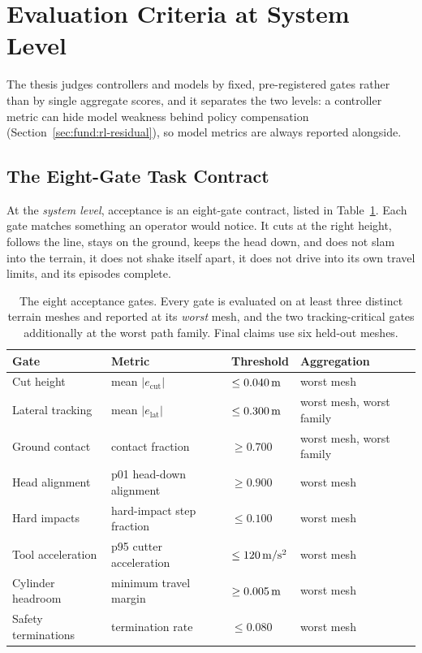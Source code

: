 \section{Evaluation Criteria at System Level}
\label{sec:sys:evaluation-criteria}

The thesis judges controllers and models by fixed, pre-registered
gates rather than by single aggregate scores, and it separates the two levels: a controller metric can hide model weakness behind
policy compensation (Section~\ref{sec:fund:rl-residual}), so model
metrics are always reported alongside.

\subsection{The Eight-Gate Task Contract}

At the \emph{system level}, acceptance is an eight-gate contract, listed
in Table~\ref{tab:sys:gates}. Each gate matches something an operator would notice. It cuts at the right
height, follows the line, stays on the ground, keeps the head down, and does not slam into
the terrain, it does not shake itself apart, it does not drive into its
own travel limits, and its episodes complete.

\begin{table}[tb]
  \centering
  \caption{The eight acceptance gates. Every gate is evaluated on at
  least three distinct terrain meshes and reported at its \emph{worst}
  mesh, and the two tracking-critical gates additionally at the worst
  path family. Final claims use six held-out meshes.}
  \label{tab:sys:gates}
  \small
  \begin{tabular}{llll}
    \toprule
    Gate & Metric & Threshold & Aggregation \\
    \midrule
    Cut height        & mean $|e_{\mathrm{cut}}|$
                      & $\leq \unit[0.040]{m}$ & worst mesh \\
    Lateral tracking  & mean $|e_{\mathrm{lat}}|$
                      & $\leq \unit[0.300]{m}$ & worst mesh, worst family \\
    Ground contact    & contact fraction
                      & $\geq 0.700$ & worst mesh, worst family \\
    Head alignment    & p01 head-down alignment
                      & $\geq 0.900$ & worst mesh \\
    Hard impacts      & hard-impact step fraction
                      & $\leq 0.100$ & worst mesh \\
    Tool acceleration & p95 cutter acceleration
                      & $\leq \unit[120]{m/s^2}$ & worst mesh \\
    Cylinder headroom & minimum travel margin
                      & $\geq \unit[0.005]{m}$ & worst mesh \\
    Safety terminations & termination rate
                      & $\leq 0.080$ & worst mesh \\
    \bottomrule
  \end{tabular}
\end{table}

